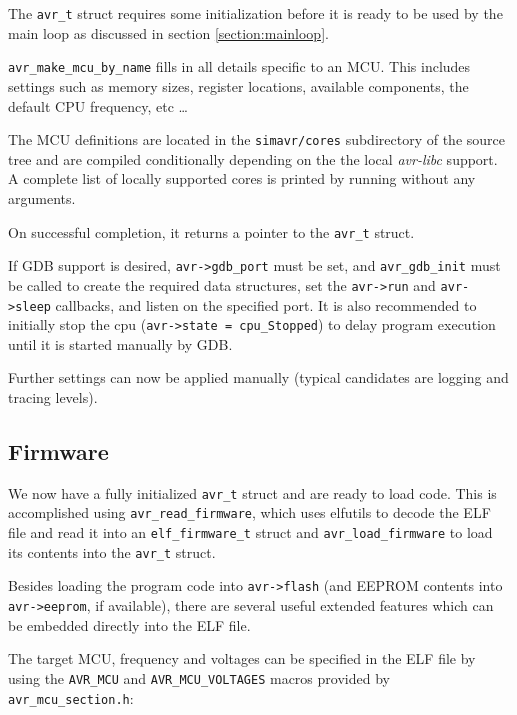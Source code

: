 The \lstinline|avr_t| struct requires some initialization before it is
ready to be used by the main loop as discussed in section \ref{section:mainloop}.

\lstinline|avr_make_mcu_by_name| fills in all details specific to an \ac{MCU}. This
includes settings such as memory sizes, register locations, available components,
the default \ac{CPU} frequency, etc \ldots

The \ac{MCU} definitions are located in the \verb|simavr/cores| subdirectory of the \simavr
source tree and are compiled conditionally depending on the the local \emph{avr-libc}
support. A complete list of locally supported cores is printed by running \simavr
without any arguments.

On successful completion, it returns a pointer to the \lstinline|avr_t| struct.

If \ac{GDB} support is desired, \lstinline|avr->gdb_port| must be set, and
\lstinline|avr_gdb_init| must be called to create the required data structures,
set the \lstinline|avr->run| and \lstinline|avr->sleep| callbacks, and listen
on the specified port. It is also recommended to initially stop the cpu
(\lstinline|avr->state = cpu_Stopped|) to delay program execution until it
is started manually by \ac{GDB}.

Further settings can now be applied manually (typical candidates are logging and
tracing levels).

\subsection{Firmware} \label{subsection:initialization_firmware}

We now have a fully initialized \lstinline|avr_t| struct and are ready to load
code. This is accomplished using \lstinline|avr_read_firmware|, which uses
elfutils to decode the \ac{ELF} file and read it into an \lstinline|elf_firmware_t|
struct and \lstinline|avr_load_firmware| to load its contents into the
\lstinline|avr_t| struct.

Besides loading the program code into \lstinline|avr->flash| (and \ac{EEPROM} contents
into \lstinline|avr->eeprom|, if available), there are several useful extended
features which can be embedded directly into the \ac{ELF} file.

The target \ac{MCU}, frequency and voltages can be specified in the \ac{ELF} file by using the
\lstinline|AVR_MCU| and \lstinline|AVR_MCU_VOLTAGES| macros provided by
\verb|avr_mcu_section.h|:

